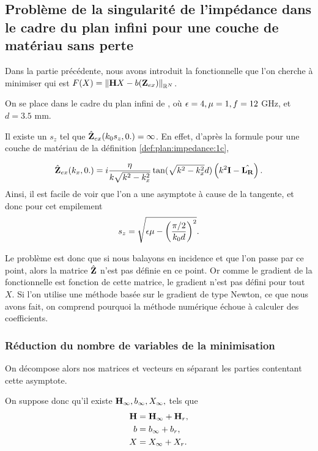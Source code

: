 \subsection{Problème de la singularité de l'impédance dans le cadre du plan infini pour une couche de matériau sans perte}

Dans la partie précédente, nous avons introduit la fonctionnelle que l'on cherche à minimiser qui est \(F(X) = \left\lVert{\mathbf{H}} X - b(\mathbf{Z}_{ex})\right\rVert_{\mathbb R^N}\).

On se place dans le cadre du plan infini de \cite{aubakirov_electromagnetic_2014}, où \(\epsilon=4,\mu=1,f=12\) GHz, et \(d=3.5\) mm. %

Il existe un \(s_z\) tel que \(\hat{\mathbf{Z}}_{ex}(k_0s_z,0.) = \infty\). En effet, d'après la formule pour une couche de matériau de la définition \ref{def:plan:impedance:1c}, 

\begin{equation}
  \hat{\mathbf{Z}}_{ex}(k_x,0.) = i\dfrac{\eta}{k\sqrt{k^2 - k_x^2}}\tan(\sqrt{k^2 - k_x^2}d)\left(k^2\mathbf{I} - \hat{\mathbf{L_R}}\right).
\end{equation}
Ainsi, il est facile de voir que l'on a une asymptote à cause de la tangente, et donc pour cet empilement
\begin{equation}
  s_z = \sqrt{\epsilon \mu - \left(\dfrac{\pi/2}{k_0 d}\right)^2}.
\end{equation}

Le problème est donc que si nous balayons en incidence et que l'on passe par ce point, alors la matrice \(\hat{\mathbf{Z}}\) n'est pas définie en ce point. Or comme le gradient de la fonctionnelle est fonction de cette matrice, le gradient n'est pas défini pour tout \(X\). Si l'on utilise une méthode basée sur le gradient de type Newton, ce que nous avons fait, on comprend pourquoi la méthode numérique échoue à calculer des coefficients.

\subsubsection{Réduction du nombre de variables de la minimisation}

On décompose alors nos matrices et vecteurs en séparant les parties contentant cette asymptote.

On suppose donc qu'il existe \({\mathbf{H}}_\infty, {b}_\infty, X_\infty,\) tels que
\begin{align*}
  {\mathbf{H}} &= {\mathbf{H}}_\infty + {\mathbf{H}}_r,
  \\
  {b} &= {b}_\infty + {b}_r,
  \\
  X &= X_\infty + X_r.
\end{align*}

